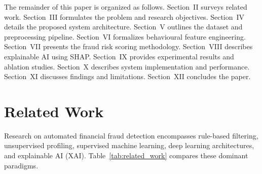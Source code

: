 \documentclass[conference]{IEEEtran}
\begin{document}
The remainder of this paper is organized as follows. Section~II surveys related work. Section~III formulates the problem and research objectives. Section~IV details the proposed system architecture. Section~V outlines the dataset and preprocessing pipeline. Section~VI formalizes behavioural feature engineering. Section~VII presents the fraud risk scoring methodology. Section~VIII describes explainable AI using SHAP. Section~IX provides experimental results and ablation studies. Section~X describes system implementation and performance. Section~XI discusses findings and limitations. Section~XII concludes the paper.

\section{Related Work}

Research on automated financial fraud detection encompasses rule-based filtering, unsupervised profiling, supervised machine learning, deep learning architectures, and explainable AI (XAI). Table~\ref{tab:related_work} compares these dominant paradigms.
\end{document}

